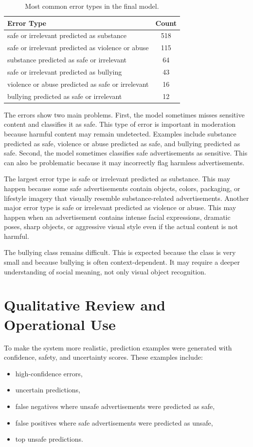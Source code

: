 \documentclass[12pt]{article}
\begin{document}
\begin{table}[H]
\centering
\begin{tabular}{lc}
\toprule
\textbf{Error Type} & \textbf{Count} \\
\midrule
safe or irrelevant predicted as substance & 518 \\
safe or irrelevant predicted as violence or abuse & 115 \\
substance predicted as safe or irrelevant & 64 \\
safe or irrelevant predicted as bullying & 43 \\
violence or abuse predicted as safe or irrelevant & 16 \\
bullying predicted as safe or irrelevant & 12 \\
\bottomrule
\end{tabular}
\caption{Most common error types in the final model.}
\label{tab:errors}
\end{table}

The errors show two main problems. First, the model sometimes misses sensitive content and classifies it as safe. This type of error is important in moderation because harmful content may remain undetected. Examples include substance predicted as safe, violence or abuse predicted as safe, and bullying predicted as safe. Second, the model sometimes classifies safe advertisements as sensitive. This can also be problematic because it may incorrectly flag harmless advertisements.

The largest error type is safe or irrelevant predicted as substance. This may happen because some safe advertisements contain objects, colors, packaging, or lifestyle imagery that visually resemble substance-related advertisements. Another major error type is safe or irrelevant predicted as violence or abuse. This may happen when an advertisement contains intense facial expressions, dramatic poses, sharp objects, or aggressive visual style even if the actual content is not harmful.

The bullying class remains difficult. This is expected because the class is very small and because bullying is often context-dependent. It may require a deeper understanding of social meaning, not only visual object recognition.

\section{Qualitative Review and Operational Use}

To make the system more realistic, prediction examples were generated with confidence, safety, and uncertainty scores. These examples include:
\begin{itemize}
    \item high-confidence errors,
    \item uncertain predictions,
    \item false negatives where unsafe advertisements were predicted as safe,
    \item false positives where safe advertisements were predicted as unsafe,
    \item top unsafe predictions.
\end{itemize}
\end{document}
